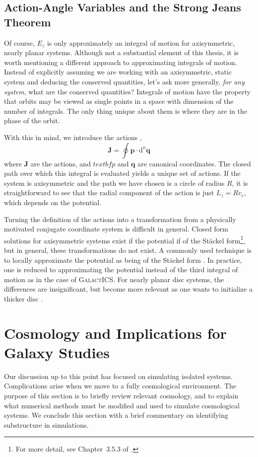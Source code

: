 \subsection{Action-Angle Variables and the Strong Jeans Theorem}

Of course, $E_z$ is only approximately an integral of motion for axisymmetric, nearly planar systems. Although not a substantial element of this thesis, it is worth mentioning a different approach to approximating integrals of motion. Instead of explicitly assuming we are working with an axisymmetric, static system and deducing the conserved quantities, let's ask more generally, \textit{for any system}, what are the conserved quantities? Integrals of motion have the property that orbits may be viewed as single points in a space with dimension of the number of integrals. The only thing unique about them is where they are in the phase of the orbit.

With this in mind, we introduce the actions \citep{BT},
\begin{equation}
\textbf{J} = \oint \textbf{p} \cdot \text{d}^n \textbf{q}
\end{equation}
where $\textbf{J}$ are the actions, and $textbf{p}$ and $\textbf{q}$ are canonical coordinates. The closed path over which this integral is evaluated yields a unique set of actions. If the system is axisymmetric and the path we have chosen is a circle of radius $R$, it is straightforward to see that the radial component of the action is just $L_z = R v_c$, which depends on the potential. 

Turning the definition of the actions into a transformation from a physically motivated conjugate coordinate system is difficult in general. Closed form solutions for axisymmetric systems exist if the potential if of the St\"ackel form\footnote{For more detail, see Chapter~3.5.3 of \citet{BT}.}, but in general, these transformations do not exist. A commonly used technique is to locally approximate the potential as being of the St\"ackel form \citet{binney_2012}. In practice, one is reduced to approximating the potential instead of the third integral of motion as in the case of \textsc{GalactICS}. For nearly planar disc systems, the differences are insignificant, but become more relevant as one wants to initialize a thicker disc \citep{vasiliev_2018,bauer2018b}.


\section{Cosmology and Implications for Galaxy Studies} \label{sec:cosmology}
Our discussion up to this point has focused on simulating isolated systems. Complications arise when we move to a fully cosmological environment. The purpose of this section is to briefly review relevant cosmology, and to explain what numerical methods must be modified and used to simulate cosmological systems. We conclude this section with a brief commentary on identifying substructure in simulations.

